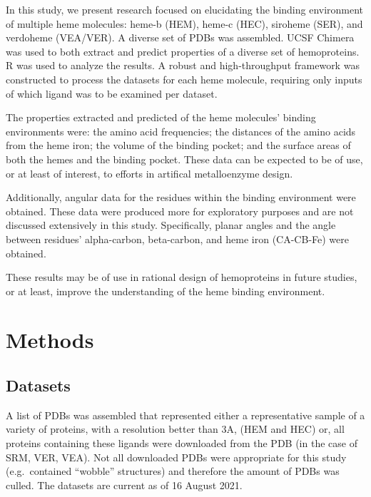 \documentclass[a4paper, nobind]{templates/ociamthesis}
\begin{document}
In this study, we present research focused on elucidating the binding environment of multiple heme molecules: heme-b (HEM), heme-c (HEC), siroheme (SER), and verdoheme (VEA/VER). A diverse set of PDBs was assembled. UCSF Chimera was used to both extract and predict properties of a diverse set of hemoproteins. R was used to analyze the results. A robust and high-throughput framework was constructed to process the datasets for each heme molecule, requiring only inputs of which ligand was to be examined per dataset.

The properties extracted and predicted of the heme molecules' binding environments were: the amino acid frequencies; the distances of the amino acids from the heme iron; the volume of the binding pocket; and the surface areas of both the hemes and the binding pocket. These data can be expected to be of use, or at least of interest, to efforts in artifical metalloenzyme design.

Additionally, angular data for the residues within the binding environment were obtained. These data were produced more for exploratory purposes and are not discussed extensively in this study. Specifically, planar angles and the angle between residues' alpha-carbon, beta-carbon, and heme iron (CA-CB-Fe) were obtained.

These results may be of use in rational design of hemoproteins in future studies, or at least, improve the understanding of the heme binding environment.

\adjustmtc
{}

\hypertarget{methods}{%
\chapter{Methods}\label{methods}}

\hypertarget{datasets}{%
\section{Datasets}\label{datasets}}

\noindent A list of PDBs was assembled that represented either a representative sample of a variety of proteins, with a resolution better than 3A, (HEM and HEC) or, all proteins containing these ligands were downloaded from the PDB (in the case of SRM, VER, VEA). Not all downloaded PDBs were appropriate for this study (e.g.~contained ``wobble'' structures) and therefore the amount of PDBs was culled. The datasets are current as of 16 August 2021.
\end{document}
